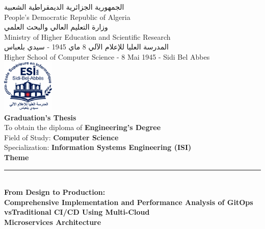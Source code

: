 \thispagestyle{empty}

\begin{center}

{\footnotesize \textarabic{الجمهورية الجزائرية الديمقراطية الشعبية}} \\[0.05cm]
{\footnotesize People's Democratic Republic of Algeria} \\[0.1cm]

{\footnotesize \textarabic{وزارة التعليم العالي والبحث العلمي}} \\[0.05cm]
{\footnotesize Ministry of Higher Education and Scientific Research} \\[0.1cm]

{\footnotesize \textarabic{المدرسة العليا للإعلام الآلي 8 ماي 1945 - سيدي بلعباس}} \\[0.05cm]
{\footnotesize Higher School of Computer Science - 8 Mai 1945 - Sidi Bel Abbes} \\[0.2cm]

\includegraphics[width=2.5cm]{figures/logos/esi-sba-logo.png} \\[0.15cm]

{\Large \textbf{Graduation's Thesis}} \\[0.3cm]

{\small To obtain the diploma of \textbf{Engineering's Degree}} \\[0.1cm]
{\small Field of Study: \textbf{Computer Science}} \\[0.1cm]
{\small Specialization: \textbf{Information Systems Engineering (ISI)}} \\[0.4cm]

{\large \textbf{Theme}} \\[0.2cm]
\rule{13cm}{0.5pt} \\[0.3cm]

{\LARGE \textbf{From Design to Production:}} \\[0.1cm]
{\LARGE \textbf{Comprehensive Implementation and Performance Analysis of GitOps vsTraditional CI/CD Using Multi-Cloud}} \\[0.1cm]
{\LARGE \textbf{Microservices Architecture}} \\[0.1cm]


\end{center}
